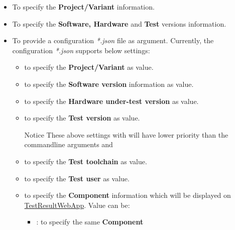       \begin{itemize}
        \item {}
          To specify the \textbf{Project/Variant} information.
        
        \item {}
          To specify the \textbf{Software, Hardware} and \textbf{Test} versions 
          information.
        
        \item {}
          To provide a configuration \emph{*.json} file as  argument.
          Currently, the configuration \emph{*.json} supports below settings:
        
          \begin{itemize}
            \item {} to specify the \textbf{Project/Variant} as 
                   value.
            \item {} to specify the \textbf{Software version} 
                  information as  value.
            \item {} to specify the 
                  \textbf{Hardware under-test version} as  value.
            \item {} to specify the \textbf{Test version} as 
                   value.
            \begin{boxhint} {Notice}
              These above settings with  will have lower 
              priority than the commandline arguments  
              and 
            \end{boxhint}
            \item {} to specify the \textbf{Test toolchain} as 
                   value.
            \item {} to specify the \textbf{Test user} as 
                   value.
            \item {} to specify the \textbf{Component} 
                  information which will be displayed on 
                  \href{https://github.com/test-fullautomation/testresultwebapp}
                  {TestResultWebApp}. Value can be:
              \begin{itemize}
                \item {}: to specify the same \textbf{Component} 

\end{itemize}
\end{itemize}
\end{itemize}
